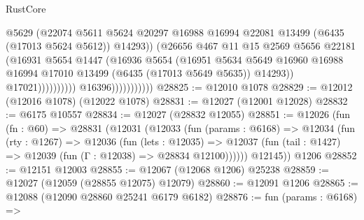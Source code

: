 \begin{lexlean}{RustCore}
\begin{coremodule}
                                            @5629
                                            (@22074
                                              @5611
                                              @5624
                                              @20297
                                              @16988
                                              @16994
                                              @22081
                                              @13499
                                              (@6435 (@17013 @5624 @5612))
                                              @14293))
                                          (@26656
                                            @467
                                            @11
                                            @15
                                            @2569
                                            @5656
                                            @22181
                                            (@16931
                                              @5654
                                              @1447
                                              (@16936
                                                @5654
                                                (@16951
                                                  @5634
                                                  @5649
                                                  @16960
                                                  @16988
                                                  @16994
                                                  @17010
                                                  @13499
                                                  (@6435 (@17013 @5649 @5635))
                                                  @14293))
                                              @17021))))))))))
                          @16396)))))))))))
@28825 := @12010 @1078
@28829 := @12012 (@12016 @1078) (@12022 @1078)
@28831 := @12027 (@12001 @12028)
@28832 := @6175 @10557
@28834 := @12027 (@28832 @12055)
@28851 := @12026
    (fun (fn : @60) =>
    @28831
      (@12031
        (@12033
          (fun (params : @6168) =>
          @12034
            (fun (rty : @1267) =>
            @12036
              (fun (lets : @12035) =>
              @12037 (fun (tail : @1427) => @12039 (fun (Γ : @12038) => @28834 @12100))))))
        @12145))
    @1206
@28852 := @12151 @12003
@28855 := @12067 (@12068 @1206) @25238
@28859 := @12027 (@12059 (@28855 @12075) @12079)
@28860 := @12091 @1206
@28865 := @12088 (@12090 @28860 @25241 @6179 @6182)
@28876 := fun (params : @6168) =>

\end{coremodule}
\end{lexlean}
